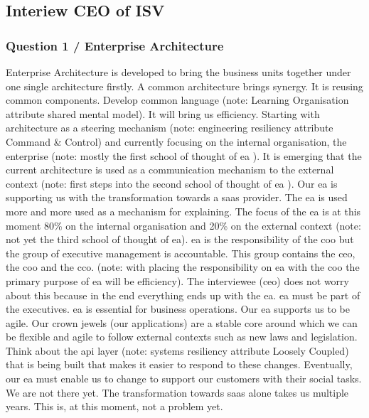 \subsection{Interiew CEO of ISV}
\label{sub:interviewceoisv}
\subsubsection{Question 1 / Enterprise Architecture}
Enterprise Architecture is developed to bring the business units together under one single architecture firstly. A common architecture brings synergy. It is reusing common components. Develop common language (note: Learning Organisation attribute shared mental model). It will bring us efficiency. Starting with architecture as a steering mechanism (note: engineering \gls{resiliency} attribute Command \& Control) and currently focusing on the internal organisation, the enterprise (note: mostly the first school of thought of \acrshort{ea} \parencite{Lapalme2012}). It is emerging that the current architecture is used as a communication mechanism to the external context (note: first steps into the second school of thought of \acrshort{ea} \parencite{Lapalme2012}). Our \acrshort{ea} is supporting us with the transformation towards a \acrfull{saas} provider. The \acrshort{ea} is used more and more used as a mechanism for explaining. The focus of the \acrshort{ea} is at this moment 80\% on the internal organisation and 20\% on the external context (note: not yet the third school of thought of \acrshort{ea}).
\acrshort{ea} is the responsibility of the \acrfull{coo} but the group of executive management is accountable. This group contains the \acrfull{ceo}, the \acrshort{coo} and the \acrfull{cco}. (note: with placing the responsibility on \acrshort{ea} with the \acrshort{coo} the primary purpose of \acrshort{ea} will be efficiency). The interviewee (\acrshort{ceo}) does not worry about this because in the end everything ends up with the \acrshort{ea}. \acrshort{ea} must be part of the executives. \acrshort{ea} is essential for business operations.
Our \acrshort{ea} supports us to be agile. Our crown jewels (our applications) are a stable core around which we can be flexible and agile to follow external contexts such as new laws and legislation. Think about the \acrfull{api} layer (note: systems \gls{resiliency} attribute Loosely Coupled) that is being built that makes it easier to respond to these changes. Eventually, our \acrshort{ea} must enable us to change to support our customers with their social tasks. We are not there yet. The transformation towards \acrfull{saas} alone takes us multiple years. This is, at this moment, not a problem yet.
